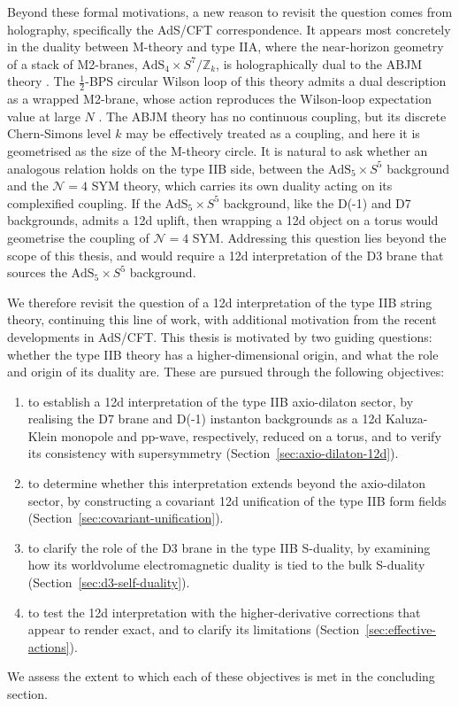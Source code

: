 Beyond these formal motivations, a new reason to revisit the question comes from holography, specifically the AdS/CFT correspondence.
It appears most concretely in the duality between M-theory and type IIA, where the near-horizon geometry of a stack of M2-branes, $\mathrm{AdS}_4 \times S^7/\mathbb{Z}_k$, is holographically dual to the ABJM theory \cite{Aharony:2008ug}.
The $\tfrac{1}{2}$-BPS circular Wilson loop of this theory admits a dual description as a wrapped M2-brane, whose action reproduces the Wilson-loop expectation value at large $N$ \cite{Giombi:2023vzu,Tseytlin:2024euk}.
The ABJM theory has no continuous coupling, but its discrete Chern-Simons level $k$ may be effectively treated as a coupling, and here it is geometrised as the size of the M-theory circle.
It is natural to ask whether an analogous relation holds on the type IIB side, between the $\mathrm{AdS}_5 \times S^5$ background and the $\mathcal{N}=4$ SYM theory, which carries its own \SLZ{} duality acting on its complexified coupling.
If the $\mathrm{AdS}_5 \times S^5$ background, like the D(-1) and D7 backgrounds, admits a 12d uplift, then wrapping a 12d object on a torus would geometrise the coupling of $\mathcal{N}=4$ SYM.
Addressing this question lies beyond the scope of this thesis, and would require a 12d interpretation of the D3 brane that sources the $\mathrm{AdS}_5 \times S^5$ background.

We therefore revisit the question of a 12d interpretation of the type IIB string theory, continuing this line of work, with additional motivation from the recent developments in AdS/CFT.
This thesis is motivated by two guiding questions: whether the type IIB theory has a higher-dimensional origin, and what the role and origin of its \SLZ{} duality are.
These are pursued through the following objectives:
\begin{enumerate}
    \item to establish a 12d interpretation of the type IIB axio-dilaton sector, by realising the D7 brane and D(-1) instanton backgrounds as a 12d Kaluza-Klein monopole and pp-wave, respectively, reduced on a torus, and to verify its consistency with supersymmetry (Section~\ref{sec:axio-dilaton-12d}).
    \item to determine whether this interpretation extends beyond the axio-dilaton sector, by constructing a covariant 12d unification of the type IIB form fields (Section~\ref{sec:covariant-unification}).
    \item to clarify the role of the D3 brane in the type IIB S-duality, by examining how its worldvolume electromagnetic duality is tied to the bulk \SLZ{} S-duality (Section~\ref{sec:d3-self-duality}).
    \item to test the 12d interpretation with the higher-derivative corrections that appear to render \SLZ{} exact, and to clarify its limitations (Section~\ref{sec:effective-actions}).
\end{enumerate}
We assess the extent to which each of these objectives is met in the concluding section.

